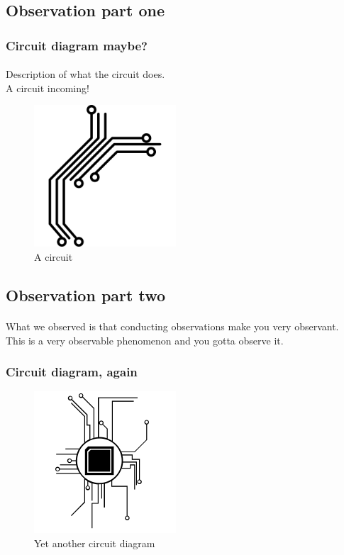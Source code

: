 \documentclass[11pt,a4paper]{article}
\begin{document}
\subsection*{Observation part one}

\subsubsection*{Circuit diagram maybe?}

\paragraph*{}
Description of what the circuit does.\\
A circuit incoming!\\

\begin{figure}[H]
	\centering
	\includegraphics[width=150pt]{cir1.png}
	\caption{A circuit}
	\label{fig:circuit1}
\end{figure}

\subsection*{Observation part two}

\paragraph*{}
What we observed is that conducting observations make you very observant.\\
This is a very observable phenomenon and you gotta observe it.\\

\subsubsection*{Circuit diagram, again}

\begin{figure}[H]
	\centering
	\includegraphics[width=150pt]{cir2.png}
	\caption{Yet another circuit diagram}
	\label{fig:circuit2}
\end{figure}
\end{document}
